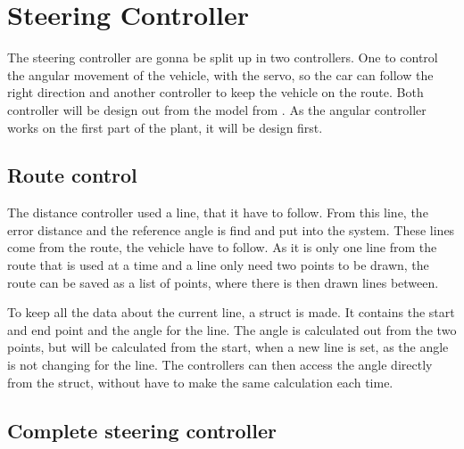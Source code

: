 \section{Steering Controller}\label{sec:steeringController}
The steering controller are gonna be split up in two controllers. One to control the angular movement of the vehicle, with the servo, so the car can follow the right direction and another controller to keep the vehicle on the route. Both controller will be design out from the model from . As the angular controller works on the first part of the plant, it will be design first.





\subsection{Route control}
The distance controller used a line, that it have to follow. From this line, the error distance and the reference angle is find and put into the system. These lines come from the route, the vehicle have to follow. As it is only one line from the route that is used at a time and a line only need two points to be drawn, the route can be saved as a list of points, where there is then drawn lines between.

To keep all the data about the current line, a struct is made. It contains the start and end point and the angle for the line. The angle is calculated out from the two points, but will be calculated from the start, when a new line is set, as the angle is not changing for the line. The controllers can then access the angle directly from the struct, without have to make the same calculation each time.


\subsection{Complete steering controller}

